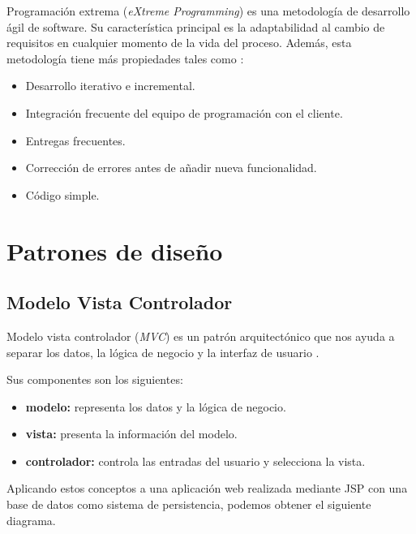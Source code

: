 Programación extrema (\emph{eXtreme Programming}) es una metodología de desarrollo ágil de software. Su característica principal es la adaptabilidad al cambio de requisitos en cualquier momento de la vida del proceso. Además, esta metodología tiene más propiedades tales como \cite{xp:wiki}:

\begin{itemize}
\tightlist
\item
  Desarrollo iterativo e incremental.
\item
  Integración frecuente del equipo de programación con el cliente.
\item
  Entregas frecuentes.
\item
  Corrección de errores antes de añadir nueva funcionalidad.
\item
  Código simple.
\end{itemize}

\section{Patrones de diseño}

\subsection{Modelo Vista Controlador}

Modelo vista controlador (\emph{MVC}) es un patrón arquitectónico que nos ayuda a separar los datos, la lógica de negocio y la interfaz de usuario \cite{mvc:wiki}.


Sus componentes son los siguientes:

\begin{itemize}
\tightlist
\item
  \textbf{modelo:} representa los datos y la lógica de negocio.
\item
  \textbf{vista:} presenta la información del modelo.
\item
  \textbf{controlador:} controla las entradas del usuario y selecciona la vista.
\end{itemize}


Aplicando estos conceptos a una aplicación web realizada mediante JSP con una base de datos como sistema de persistencia, podemos obtener el siguiente diagrama.


